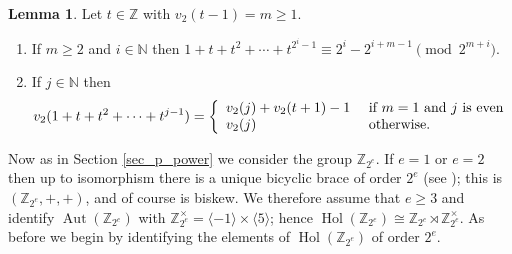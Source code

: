\documentclass[reqno]{amsart}
\theoremstyle{definition}
\newtheorem{lemma}[theorem]{Lemma}
\newcommand{\Z}{\mathbb{Z}}
\newcommand{\N}{\mathbb{N}}
\DeclareMathOperator{\Hol}{\mbox{Hol}}
\DeclareMathOperator{\Aut}{\mbox{Aut}}
\begin{document}
\begin{lemma} \label{lemma_geometric_congruences_2}
Let $ t \in \Z $ with $ v_{2}(t-1)=m \geq 1 $. 
\begin{enumerate}
\item If $ m \geq 2 $ and $ i \in \N $ then $ 1 + t + t^{2} +\cdots + t^{2^{i}-1} \equiv 2^{i} - 2^{i+m-1} \pmod{2^{m+i}} $. \label{lemma_geometric_congruences_2_item_1}
\item If $ j \in \N $ then 
\[ v_{2}(1+t+t^{2}+\cdots + t^{j-1}) = 
\left\{ \begin{array}{ll} v_{2}(j) + v_{2}(t+1) - 1 & \mbox{ if $ m=1 $ and $ j $ is even} \\
v_{2}(j) & \mbox{ otherwise}. 
\end{array} \right. \]
\label{lemma_geometric_congruences_2_item_2}
\end{enumerate}
\end{lemma}


Now as in Section \ref{sec_p_power} we consider the group $ \Z_{2^{e}} $. If $ e=1 $ or $ e=2 $ then up to isomorphism there is a unique bicyclic brace of order $ 2^{e} $ (see \cite[Proposition 2.4]{Ba15}); this is $ (\Z_{2^{e}},+,+) $, and of course is biskew. We therefore assume that $ e \geq 3 $ and identify $ \Aut(\Z_{2^{e}}) $ with $ \Z_{2^{e}}^{\times} = \langle -1 \rangle \times \langle 5 \rangle $; hence $ \Hol(\Z_{2^{e}}) \cong \Z_{2^{e}} \rtimes \Z_{2^{e}}^{\times} $. As before we begin by identifying the elements of $ \Hol(\Z_{2^{e}}) $ of order $ 2^{e} $. 
\end{document}
